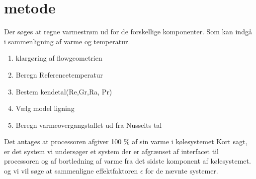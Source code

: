 \section{metode}

Der søges at regne varmestrøm ud for de forskellige komponenter. Som kan indgå i sammenligning af varme og temperatur.

\begin{enumerate}
	\item klargøring af flowgeometrien
	\item Beregn Referencetemperatur
	\item Bestem kendetal(Re,Gr,Ra, Pr)
	\item Vælg model ligning
	\item Beregn varmeovergangstallet ud fra Nusselts tal
\end{enumerate}

Det antages at processoren afgiver 100 \% af sin varme i kølesystemet
Kort sagt, er det system vi undersøger et system der er afgrænset af interfacet til processoren og af bortledning af varme fra det sidste komponent af kølesystemet.
og vi vil søge at sammenligne effektfaktoren $\epsilon$ for de nævnte systemer. 